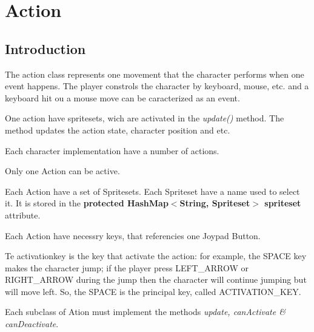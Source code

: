\chapter{Action}
	\section{Introduction}
		The action class represents one movement that the character performs when one event happens. The player constrols the character by keyboard, mouse, etc. and a keyboard hit ou a mouse move can be caracterized as an event.
		
		One action have spritesets, wich are activated in the \emph{update()} method. The method updates the action state, character position and etc.
		
		
		Each character implementation have a number of actions.
		
		Only one Action can be active. 	
		
		Each Action have a set of Spritesets. Each Spriteset have a name used to select it. It is stored in the \textbf{protected HashMap$<$String, Spriteset$>$ spriteset} attribute.
		
		Each Action have necessry keys, that referencies one Joypad Button.
		
		Te activationkey is the key that activate the action: for example, the SPACE key makes the character jump; if the player press LEFT\_ARROW or RIGHT\_ARROW during the jump then the character will continue jumping but will move left. So, the SPACE is the principal key, called ACTIVATION\_KEY.
		
		
		Each subclass of Ation must implement the methods \textit{update, canActivate \& canDeactivate}.
		
		
